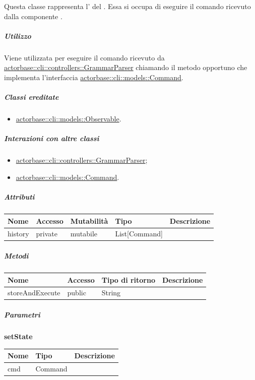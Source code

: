 \documentclass{scalatekids-article}
\begin{document}
Questa classe rappresenta l' del . Essa
si occupa di eseguire il comando ricevuto dalla componente .

\subparagraph{Utilizzo}

Viene utilizzata per eseguire il comando ricevuto da
\hyperref[sec:actorbase::cli::controllers::GrammarParser]{actorbase::cli::controllers::GrammarParser} chiamando il metodo opportuno che
implementa l'interfaccia \hyperref[sec:actorbase::cli::models::Command]{actorbase::cli::models::Command}.

\subparagraph{Classi ereditate}

\begin{itemize}
\item \hyperref[sec:actorbase::cli::models::Observable]{actorbase::cli::models::Observable}.
\end{itemize}

\subparagraph{Interazioni con altre classi}

\begin{itemize}
\item \hyperref[sec:actorbase::cli::controllers::GrammarParser]{actorbase::cli::controllers::GrammarParser};
\item \hyperref[sec:actorbase::cli::models::Command]{actorbase::cli::models::Command}.
\end{itemize}

\subparagraph{Attributi}

\begin{tabular}{| l | l | l | l | l |}
  \hline
  Nome & Accesso & Mutabilità & Tipo & Descrizione\\
  \hline
  history & private & mutabile & List[Command] & \\
  \hline
\end{tabular}

\subparagraph{Metodi}

\begin{tabular}{| l | l | l | l |}
  \hline
  Nome & Accesso & Tipo di ritorno & Descrizione\\
  \hline
  storeAndExecute & public & String & \\
  \hline
\end{tabular}

\subparagraph{Parametri}

\begin{center}
  \textbf{setState}
\end{center}
\begin{tabular}{| p{3cm} | p{3.5cm} | p{8.5cm} |}
  \hline
  Nome & Tipo & Descrizione\\
  \hline
  cmd & Command & \\
  \hline
\end{tabular}
\end{document}
